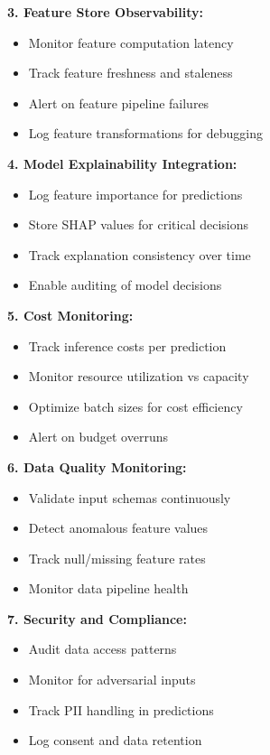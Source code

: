 \textbf{3. Feature Store Observability:}
\begin{itemize}
    \item Monitor feature computation latency
    \item Track feature freshness and staleness
    \item Alert on feature pipeline failures
    \item Log feature transformations for debugging
\end{itemize}

\textbf{4. Model Explainability Integration:}
\begin{itemize}
    \item Log feature importance for predictions
    \item Store SHAP values for critical decisions
    \item Track explanation consistency over time
    \item Enable auditing of model decisions
\end{itemize}

\textbf{5. Cost Monitoring:}
\begin{itemize}
    \item Track inference costs per prediction
    \item Monitor resource utilization vs capacity
    \item Optimize batch sizes for cost efficiency
    \item Alert on budget overruns
\end{itemize}

\textbf{6. Data Quality Monitoring:}
\begin{itemize}
    \item Validate input schemas continuously
    \item Detect anomalous feature values
    \item Track null/missing feature rates
    \item Monitor data pipeline health
\end{itemize}

\textbf{7. Security and Compliance:}
\begin{itemize}
    \item Audit data access patterns
    \item Monitor for adversarial inputs
    \item Track PII handling in predictions
    \item Log consent and data retention
\end{itemize}

